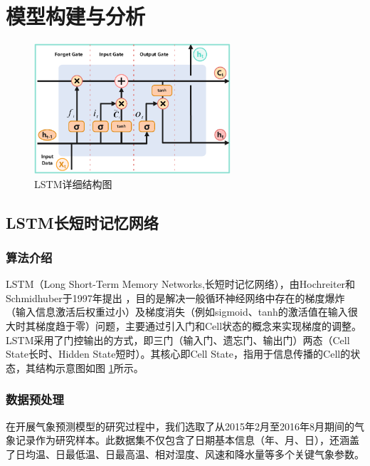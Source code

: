 \section{模型构建与分析}

\begin{figure}[ht]
  \centering
  \includegraphics[width=0.65\textwidth]{./Img/LSTM解释结构图.pdf}
  \caption{LSTM详细结构图}\label{fig:a-0}
\end{figure}

\subsection{LSTM长短时记忆网络}
\label{subsec:lstm}

\subsubsection{算法介绍}

LSTM（Long Short-Term Memory Networks,长短时记忆网络），由Hochreiter和Schmidhuber于1997年提出 \cite{LSTM_Hochrerter}，目的是解决一般循环神经网络中存在的梯度爆炸（输入信息激活后权重过小）及梯度消失（例如sigmoid、tanh的激活值在输入很大时其梯度趋于零）问题，主要通过引入门和Cell状态的概念来实现梯度的调整。LSTM采用了门控输出的方式，即三门（输入门、遗忘门、输出门）两态（Cell State长时、Hidden State短时）。其核心即Cell State，指用于信息传播的Cell的状态，其结构示意图如图 \ref{fig:a-0}所示。


\subsubsection{数据预处理}

在开展气象预测模型的研究过程中，我们选取了从2015年2月至2016年8月期间的气象记录作为研究样本。此数据集不仅包含了日期基本信息（年、月、日），还涵盖了日均温、日最低温、日最高温、相对湿度、风速和降水量等多个关键气象参数。

